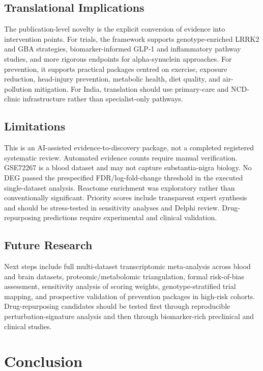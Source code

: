 \documentclass{article}
\begin{document}
\subsection{Translational Implications}

The publication-level novelty is the explicit conversion of evidence into intervention points. For trials, the framework supports genotype-enriched LRRK2 and GBA strategies, biomarker-informed GLP-1 and inflammatory pathway studies, and more rigorous endpoints for alpha-synuclein approaches. For prevention, it supports practical packages centred on exercise, exposure reduction, head-injury prevention, metabolic health, diet quality, and air-pollution mitigation. For India, translation should use primary-care and NCD-clinic infrastructure rather than specialist-only pathways.


\subsection{Limitations}

This is an AI-assisted evidence-to-discovery package, not a completed registered systematic review. Automated evidence counts require manual verification. GSE72267 is a blood dataset and may not capture substantia-nigra biology. No DEG passed the prespecified FDR/log-fold-change threshold in the executed single-dataset analysis. Reactome enrichment was exploratory rather than conventionally significant. Priority scores include transparent expert synthesis and should be stress-tested in sensitivity analyses and Delphi review. Drug-repurposing predictions require experimental and clinical validation.


\subsection{Future Research}

Next steps include full multi-dataset transcriptomic meta-analysis across blood and brain datasets, proteomic/metabolomic triangulation, formal risk-of-bias assessment, sensitivity analysis of scoring weights, genotype-stratified trial mapping, and prospective validation of prevention packages in high-risk cohorts. Drug-repurposing candidates should be tested first through reproducible perturbation-signature analysis and then through biomarker-rich preclinical and clinical studies.


\section{Conclusion}
\end{document}
